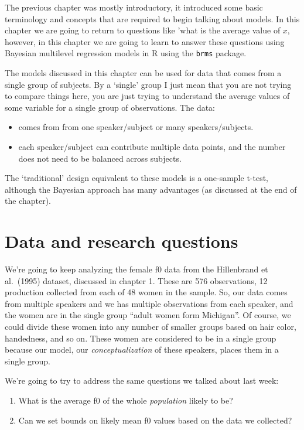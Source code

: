 \documentclass[
]{book}
\providecommand{\tightlist}{%
  \setlength{\itemsep}{0pt}\setlength{\parskip}{0pt}}
\begin{document}
The previous chapter was mostly introductory, it introduced some basic terminology and concepts that are required to begin talking about models. In this chapter we are going to return to questions like 'what is the average value of \(x\), however, in this chapter we are going to learn to answer these questions using Bayesian multilevel regression models in R using the \texttt{brms} package.

The models discussed in this chapter can be used for data that comes from a single group of subjects. By a `single' group I just mean that you are not trying to compare things here, you are just trying to understand the average values of some variable for a single group of observations. The data:

\begin{itemize}
\tightlist
\item
  comes from from one speaker/subject or many speakers/subjects.
\item
  each speaker/subject can contribute multiple data points, and the number does not need to be balanced across subjects.
\end{itemize}

The `traditional' design equivalent to these models is a one-sample t-test, although the Bayesian approach has many advantages (as discussed at the end of the chapter).

\hypertarget{data-and-research-questions-1}{%
\section{Data and research questions}\label{data-and-research-questions-1}}

We're going to keep analyzing the female f0 data from the Hillenbrand et al.~(1995) dataset, discussed in chapter 1. These are 576 observations, 12 production collected from each of 48 women in the sample. So, our data comes from multiple speakers and we has multiple observations from each speaker, and the women are in the single group ``adult women form Michigan''. Of course, we could divide these women into any number of smaller groups based on hair color, handedness, and so on. These women are considered to be in a single group because our model, our \emph{conceptualization} of these speakers, places them in a single group.

We're going to try to address the same questions we talked about last week:

\begin{enumerate}
\def\labelenumi{\arabic{enumi})}
\item
  What is the average f0 of the whole \emph{population} likely to be?
\item
  Can we set bounds on likely mean f0 values based on the data we collected?
\end{enumerate}
\end{document}
